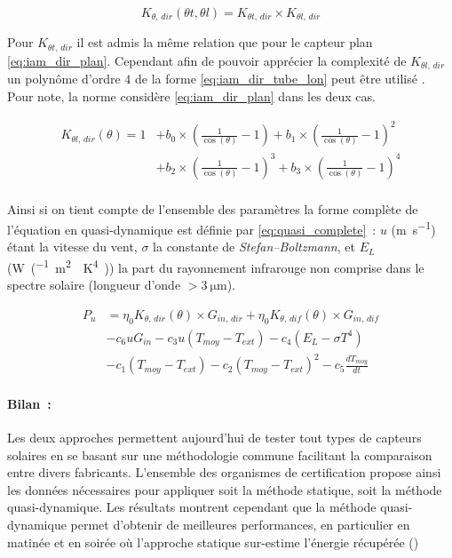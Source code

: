 \begin{equation}\label{eq:iam_dir_tube}
    K_{\theta,\,dir} (\theta t, \theta l) = K_{\theta t,\,dir} \times K_{\theta l,\,dir}
\end{equation}

Pour $K_{\theta t,\,dir}$ il est admis la même relation que pour le capteur plan \eqref{eq:iam_dir_plan}.
Cependant afin de pouvoir apprécier la complexité de $K_{\theta l,\,dir}$ un polynôme d’ordre
$4$ de la forme \eqref{eq:iam_dir_tube_lon} peut être utilisé \parencite{Zambolin201237}.
Pour note, la norme considère \eqref{eq:iam_dir_plan} dans les deux cas.

\begin{align}\label{eq:iam_dir_tube_lon}
    K_{\theta l,\,dir} (\theta) = 1 &+ b_{0} \times \left(\frac{1}{\cos(\theta)} - 1\right)
                          + b_{1} \times \left(\frac{1}{\cos(\theta)} - 1\right)^{2} \\
                          &+ b_{2} \times \left(\frac{1}{\cos(\theta)} - 1\right)^{3}
                          + b_{3} \times \left(\frac{1}{\cos(\theta)} - 1\right)^{4} \\
\end{align}

Ainsi si on tient compte de l’ensemble des paramètres la forme complète de l’équation
en quasi-dynamique est définie par \eqref{eq:quasi_complete}~: $u$ (\si{\metre\per\second})
étant la vitesse du vent, $\sigma$ la constante de \textit{Stefan–Boltzmann}, et $E_{L}$
(\si{W\per(\metre\squared\period\kelvin^{4})}) la part du rayonnement infrarouge
non comprise dans le spectre solaire (longueur d’onde $> \SI{3}{\micro\metre}$).


\begin{align}\label{eq:quasi_complete}
        P_{u}  &= \eta_{0} K_{\theta,\,dir}(\theta) \times G_{in,\,dir} +
                  \eta_{0} K_{\theta,\,dif}(\theta) \times G_{in,\,dif} \\
                &- c_{6}uG_{in} - c_{3} u(T_{moy} - T_{ext}) - c_{4} (E_{L} - \sigma T^{4}) \\
                &- c_{1} (T_{moy} - T_{ext}) - c_{2} (T_{moy} - T_{ext})^{2} - c_{5}\frac{dT_{moy}}{dt}
\end{align}


\paragraph{Bilan~:} %
\label{par:bilan_rendement}
Les deux approches permettent aujourd’hui de tester tout types de capteurs solaires
en se basant sur une méthodologie commune facilitant la comparaison entre divers
fabricants. L’ensemble des organismes de certification propose ainsi les données nécessaires
pour appliquer soit la méthode statique, soit la méthode quasi-dynamique.
Les résultats montrent cependant que la méthode quasi-dynamique permet d’obtenir de
meilleures performances, en particulier en matinée et en soirée
où l’approche statique sur-estime l’énergie récupérée ()

